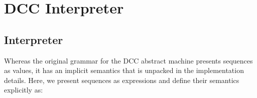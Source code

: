 \chapter{DCC Interpreter}

\section{Interpreter}

Whereas the original grammar for the DCC abstract machine presents sequences as values, it has an implicit semantics that is unpacked in the implementation details. Here, we present sequences as expressions and define their semantics explicitly as:

